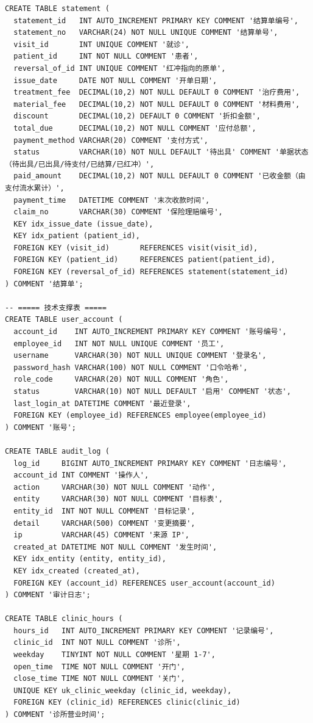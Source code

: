 \documentclass[11pt,a4paper]{ctexart}
\begin{document}
\begin{lstlisting}[style=sql]
CREATE TABLE statement (
  statement_id   INT AUTO_INCREMENT PRIMARY KEY COMMENT '结算单编号',
  statement_no   VARCHAR(24) NOT NULL UNIQUE COMMENT '结算单号',
  visit_id       INT UNIQUE COMMENT '就诊',
  patient_id     INT NOT NULL COMMENT '患者',
  reversal_of_id INT UNIQUE COMMENT '红冲指向的原单',
  issue_date     DATE NOT NULL COMMENT '开单日期',
  treatment_fee  DECIMAL(10,2) NOT NULL DEFAULT 0 COMMENT '治疗费用',
  material_fee   DECIMAL(10,2) NOT NULL DEFAULT 0 COMMENT '材料费用',
  discount       DECIMAL(10,2) DEFAULT 0 COMMENT '折扣金额',
  total_due      DECIMAL(10,2) NOT NULL COMMENT '应付总额',
  payment_method VARCHAR(20) COMMENT '支付方式',
  status         VARCHAR(10) NOT NULL DEFAULT '待出具' COMMENT '单据状态（待出具/已出具/待支付/已结算/已红冲）',
  paid_amount    DECIMAL(10,2) NOT NULL DEFAULT 0 COMMENT '已收金额（由支付流水累计）',
  payment_time   DATETIME COMMENT '末次收款时间',
  claim_no       VARCHAR(30) COMMENT '保险理赔编号',
  KEY idx_issue_date (issue_date),
  KEY idx_patient (patient_id),
  FOREIGN KEY (visit_id)       REFERENCES visit(visit_id),
  FOREIGN KEY (patient_id)     REFERENCES patient(patient_id),
  FOREIGN KEY (reversal_of_id) REFERENCES statement(statement_id)
) COMMENT '结算单';

-- ===== 技术支撑表 =====
CREATE TABLE user_account (
  account_id    INT AUTO_INCREMENT PRIMARY KEY COMMENT '账号编号',
  employee_id   INT NOT NULL UNIQUE COMMENT '员工',
  username      VARCHAR(30) NOT NULL UNIQUE COMMENT '登录名',
  password_hash VARCHAR(100) NOT NULL COMMENT '口令哈希',
  role_code     VARCHAR(20) NOT NULL COMMENT '角色',
  status        VARCHAR(10) NOT NULL DEFAULT '启用' COMMENT '状态',
  last_login_at DATETIME COMMENT '最近登录',
  FOREIGN KEY (employee_id) REFERENCES employee(employee_id)
) COMMENT '账号';

CREATE TABLE audit_log (
  log_id     BIGINT AUTO_INCREMENT PRIMARY KEY COMMENT '日志编号',
  account_id INT COMMENT '操作人',
  action     VARCHAR(30) NOT NULL COMMENT '动作',
  entity     VARCHAR(30) NOT NULL COMMENT '目标表',
  entity_id  INT NOT NULL COMMENT '目标记录',
  detail     VARCHAR(500) COMMENT '变更摘要',
  ip         VARCHAR(45) COMMENT '来源 IP',
  created_at DATETIME NOT NULL COMMENT '发生时间',
  KEY idx_entity (entity, entity_id),
  KEY idx_created (created_at),
  FOREIGN KEY (account_id) REFERENCES user_account(account_id)
) COMMENT '审计日志';

CREATE TABLE clinic_hours (
  hours_id   INT AUTO_INCREMENT PRIMARY KEY COMMENT '记录编号',
  clinic_id  INT NOT NULL COMMENT '诊所',
  weekday    TINYINT NOT NULL COMMENT '星期 1-7',
  open_time  TIME NOT NULL COMMENT '开门',
  close_time TIME NOT NULL COMMENT '关门',
  UNIQUE KEY uk_clinic_weekday (clinic_id, weekday),
  FOREIGN KEY (clinic_id) REFERENCES clinic(clinic_id)
) COMMENT '诊所营业时间';


\end{lstlisting}
\end{document}
